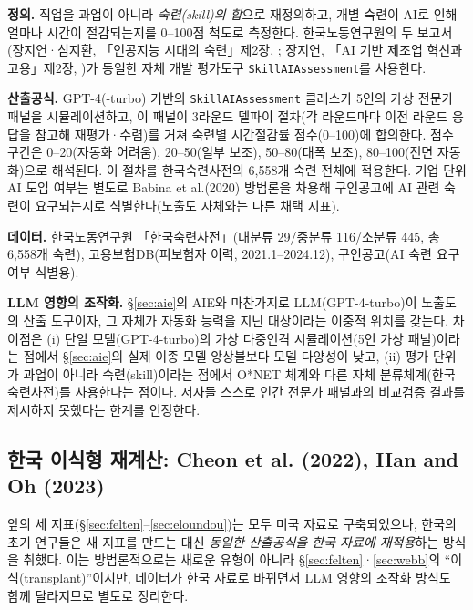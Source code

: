 \documentclass[11pt]{article}
\begin{document}
\textbf{정의.} 직업을 과업이 아니라 \emph{숙련(skill)의 합}으로 재정의하고, 개별 숙련이 AI로 인해 얼마나 시간이 절감되는지를 0--100점 척도로 측정한다. 한국노동연구원의 두 보고서(장지연·심지환, 「인공지능 시대의 숙련」제2장, \citealp{chang-2025-ai-era-skills}; 장지연, 「AI 기반 제조업 혁신과 고용」제2장, \citealp{noh-2025-ai-based-manufacturing-innovation-employment})가 동일한 자체 개발 평가도구 \texttt{SkillAIAssessment}를 사용한다.

\textbf{산출공식.} GPT-4(-turbo) 기반의 \texttt{SkillAIAssessment} 클래스가 5인의 가상 전문가 패널을 시뮬레이션하고, 이 패널이 3라운드 델파이 절차(각 라운드마다 이전 라운드 응답을 참고해 재평가·수렴)를 거쳐 숙련별 시간절감률 점수(0--100)에 합의한다. 점수 구간은 0--20(자동화 어려움), 20--50(일부 보조), 50--80(대폭 보조), 80--100(전면 자동화)으로 해석된다. 이 절차를 한국숙련사전의 6,558개 숙련 전체에 적용한다. 기업 단위 AI 도입 여부는 별도로 Babina et al.(2020) 방법론을 차용해 구인공고에 AI 관련 숙련이 요구되는지로 식별한다(노출도 자체와는 다른 채택 지표).

\textbf{데이터.} 한국노동연구원 「한국숙련사전」(대분류 29/중분류 116/소분류 445, 총 6,558개 숙련), 고용보험DB(피보험자 이력, 2021.1--2024.12), 구인공고(AI 숙련 요구 여부 식별용).

\textbf{LLM 영향의 조작화.} \S\ref{sec:aie}의 AIE와 마찬가지로 LLM(GPT-4-turbo)이 노출도의 산출 도구이자, 그 자체가 자동화 능력을 지닌 대상이라는 이중적 위치를 갖는다. 차이점은 (i) 단일 모델(GPT-4-turbo)의 가상 다중인격 시뮬레이션(5인 가상 패널)이라는 점에서 \S\ref{sec:aie}의 실제 이종 모델 앙상블보다 모델 다양성이 낮고, (ii) 평가 단위가 과업이 아니라 숙련(skill)이라는 점에서 O*NET 체계와 다른 자체 분류체계(한국숙련사전)를 사용한다는 점이다. 저자들 스스로 인간 전문가 패널과의 비교검증 결과를 제시하지 못했다는 한계를 인정한다.

\subsection{한국 이식형 재계산: Cheon et al. (2022), Han and Oh (2023)}
\label{sec:korean-transplant}

앞의 세 지표(\S\ref{sec:felten}--\ref{sec:eloundou})는 모두 미국 자료로 구축되었으나, 한국의 초기 연구들은 새 지표를 만드는 대신 \emph{동일한 산출공식을 한국 자료에 재적용}하는 방식을 취했다. 이는 방법론적으로는 새로운 유형이 아니라 \S\ref{sec:felten}·\ref{sec:webb}의 ``이식(transplant)''이지만, 데이터가 한국 자료로 바뀌면서 LLM 영향의 조작화 방식도 함께 달라지므로 별도로 정리한다.
\end{document}
